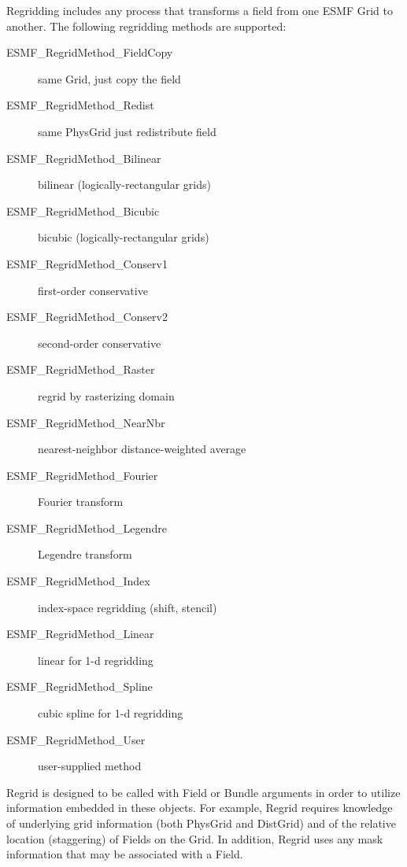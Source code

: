 


Regridding includes any process that transforms a field from one ESMF
Grid to another.  The following regridding methods are supported:
\begin{description}
\item[ESMF\_RegridMethod\_FieldCopy] same Grid, just copy the field
\item[ESMF\_RegridMethod\_Redist  ] same PhysGrid just redistribute field
\item[ESMF\_RegridMethod\_Bilinear] bilinear (logically-rectangular grids)
\item[ESMF\_RegridMethod\_Bicubic ] bicubic  (logically-rectangular grids)
\item[ESMF\_RegridMethod\_Conserv1] first-order conservative
\item[ESMF\_RegridMethod\_Conserv2] second-order conservative
\item[ESMF\_RegridMethod\_Raster  ] regrid by rasterizing domain
\item[ESMF\_RegridMethod\_NearNbr ] nearest-neighbor distance-weighted average
\item[ESMF\_RegridMethod\_Fourier ] Fourier transform
\item[ESMF\_RegridMethod\_Legendre] Legendre transform
\item[ESMF\_RegridMethod\_Index   ] index-space regridding (shift, stencil)
\item[ESMF\_RegridMethod\_Linear  ] linear for 1-d regridding
\item[ESMF\_RegridMethod\_Spline  ] cubic spline for 1-d regridding
\item[ESMF\_RegridMethod\_User    ] user-supplied method
\end{description}

Regrid is designed to be called with Field or Bundle
arguments in order to utilize information embedded in
these objects.  For example, Regrid requires knowledge
of underlying grid information (both PhysGrid and DistGrid)
and of the relative location (staggering) of Fields on
the Grid.  In addition, Regrid uses any mask information
that may be associated with a Field.

